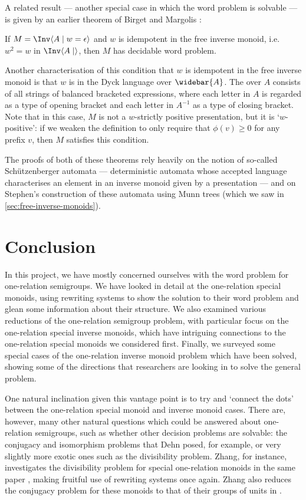 \documentclass[noindex,noinsetproof,12pt]{lmaths}
\newcommand{\Abar}{\widebar{A}}
\begin{document}
A related result --- another special case in which the word problem is solvable --- is given by an earlier theorem of Birget and Margolis \cite{Birget1994}:
\begin{theorem}
	If $M = \Inv \langle A \mid w = \epsilon\rangle$ and $w$ is idempotent in the free inverse monoid, i.e. $w^2 = w$ in $\Inv \langle A \mid \rangle$, then $M$ has decidable word problem. \label{thm:idempotent-generated-WP-decidable}
\end{theorem}
Another characterisation of this condition that $w$ is idempotent in the free inverse monoid is that $w$ is in the Dyck language over $\Abar$. The  over $A$ consists of all strings of balanced bracketed expressions, where each letter in $A$ is regarded as a type of opening bracket and each letter in $A^{-1}$ as a type of closing bracket.
Note that in this case, $M$ is not a $w$-strictly positive presentation, but it is `$w$-positive': if we weaken the definition to only require that $\phi(v) \ge 0$ for any prefix $v$, then $M$ satisfies this condition.

The proofs of both of these theorems rely heavily on the notion of so-called Schützenberger automata --- deterministic automata whose accepted language characterises an element in an inverse monoid given by a presentation --- and on Stephen's construction of these automata using Munn trees (which we saw in \cref{sec:free-inverse-monoids}).

\section{Conclusion}
In this project, we have mostly concerned ourselves with the word problem for one-relation semigroups. We have looked in detail at the one-relation special monoids, using rewriting systems to show the solution to their word problem and glean some information about their structure. We also examined various reductions of the one-relation semigroup problem, with particular focus on the one-relation special inverse monoids, which have intriguing connections to the one-relation special monoids we considered first. Finally, we surveyed some special cases of the one-relation inverse monoid problem which have been solved, showing some of the directions that researchers are looking in to solve the general problem.

One natural inclination given this vantage point is to try and `connect the dots' between the one-relation special monoid and inverse monoid cases. There are, however, many other natural questions which could be answered about one-relation semigroups, such as whether other decision problems are solvable: the conjugacy and isomorphism problems that Dehn posed, for example, or very slightly more exotic ones such as the divisibility problem. Zhang, for instance, investigates the divisibility problem for special one-relation monoids in the same paper \cite{Zhang1992a}, making fruitful use of rewriting systems once again. Zhang also reduces the conjugacy problem for these monoids to that of their groups of units in \cite{Zhang1991}.
\end{document}
